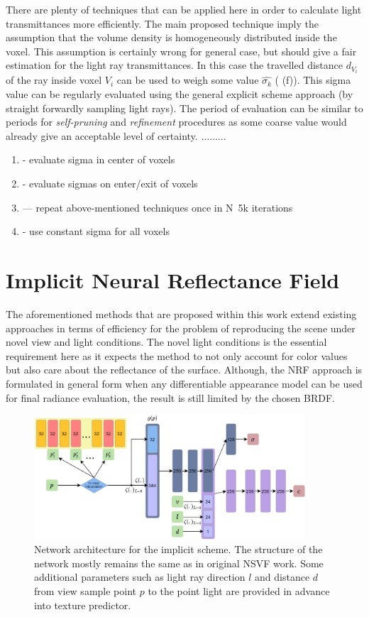 There are plenty of techniques that can be applied here in order to calculate light transmittances more efficiently.
The main proposed technique imply the assumption
that the volume density is homogeneously distributed inside the voxel.
This assumption is certainly wrong for general case,
but should give a fair estimation for the light ray transmittances.
In this case the travelled distance $d_{V_i}$ of the ray inside voxel $V_i$
can be used to weigh some value $\hat{\sigma_k}$ ( (f)).
This sigma value can be regularly evaluated
using the general explicit scheme approach (by straight forwardly sampling light rays).
The period of evaluation can be similar to periods for \textit{self-pruning} and \textit{refinement} procedures
as some coarse value would already give an acceptable level of certainty.
$\dots \dots \dots$
\begin{enumerate}
    \item - evaluate sigma in center of voxels
    \item - evaluate sigmas on enter/exit of voxels
    \item --- repeat above-mentioned techniques once in N~5k iterations
    \item - use constant sigma for all voxels
\end{enumerate}



\section{Implicit Neural Reflectance Field}

The aforementioned methods that are proposed within this work
extend existing approaches in terms of efficiency for the problem of reproducing the scene under novel view and light conditions.
The novel light conditions is the essential requirement here
as it expects the method to not only account for color values
but also care about the reflectance of the surface.
Although, the NRF approach is formulated in general form
when any differentiable appearance model can be used for final radiance evaluation,
the result is still limited by the chosen BRDF.

\begin{figure}[t]
    \centering
    \includegraphics[width=0.9\textwidth]{figures/implicit_scheme.png}
    \caption{Network architecture for the implicit scheme.
The structure of the network mostly remains the same as in original NSVF work.
Some additional parameters such as light ray direction $l$
and distance $d$ from view sample point $p$ to the point light
are provided in advance into texture predictor.
}
    \label{fig:implicit_scheme}
\end{figure}

